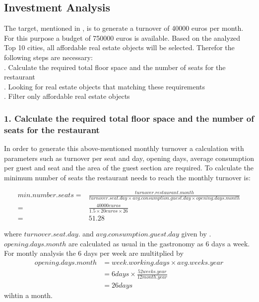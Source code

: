 \subsection{Investment Analysis}
\label{subsec:moneten}
The target, mentioned in , is to generate a turnover of 40000 euros per month. For this purpose
 a budget of 750000 euros is available. Based on the analyzed Top 10 cities, all affordable real estate objects will be
 selected. Therefor the following steps are necessary: \\
. Calculate the required total floor space and the number of seats for the restaurant \\
. Looking for real estate objects that matching these requirements \\
. Filter only affordable real estate objects \\

\subsubsection{1. Calculate the required total floor space and the number of seats for the restaurant}
In order to generate this above-mentioned monthly turnover a calculation with parameters such as turnover per seat and day,
 opening days, average consumption per guest and seat and the area of the guest section are required. To calculate the
 minimum number of seats the restaurant needs to reach the monthly turnover is:
\begin{center}
\begin{equation}
\begin{aligned}
	min.number.seats =&\frac{turnover.restaurant.month}{turnover.seat.day \times avg.consumption.guest.day \times opening.days.month} \\
	=&\frac{40000 euros}{1.5 \times 20 euros \times 26} \\
	=&51.28
\end{aligned}
\label{eq:number_seats_benchmark}
\end{equation}
\end{center}

where $turnover.seat.day.$ and $avg.consumption.guest.day$ given by \cite{BenchmarkGastronomie}. $opening.days.month$
 are calculated as usual in the gastronomy as 6 days a week. For montly analysis the 6 days per week are multitplied by
\begin{equation}
    \begin{aligned}
        opening.days.month & = week.working.days \times avg.weeks.year \\
        & = 6 days \times \frac{52 weeks.year}{12 month.year} \\
        & = 26 days
    \end{aligned}
    \label{eq:opening_days}
\end{equation}
wihtin a month.


